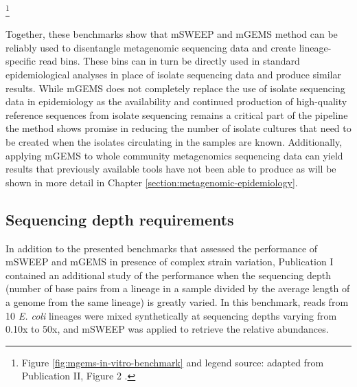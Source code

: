 \documentclass[officiallayout]{tktla}
\begin{document}
\noindent\let\thefootnote\relax\footnote{Figure \ref{fig:mgems-in-vitro-benchmark} and legend source: adapted from Publication II, Figure 2 \citep{maklin_bacterial_2021}.}

\pagebreak
Together, these benchmarks show that mSWEEP and mGEMS method can be
reliably used to disentangle metagenomic sequencing data and create
lineage-specific read bins. These bins can in turn be directly used in
standard epidemiological analyses in place of isolate sequencing data
and produce similar results. While mGEMS does not completely replace
the use of isolate sequencing data in epidemiology \textemdash{ } as
the availability and continued production of high-quality reference
sequences from isolate sequencing remains a critical part of the
pipeline \textemdash{ } the method shows promise in reducing the
number of isolate cultures that need to be created when the isolates
circulating in the samples are known. Additionally, applying mGEMS to
whole community metagenomics sequencing data can yield results that
previously available tools have not been able to produce as will be
shown in more detail in Chapter \ref{section:metagenomic-epidemiology}.

\subsection{Sequencing depth requirements}

In addition to the presented benchmarks that assessed the performance
of mSWEEP and mGEMS in presence of complex strain variation,
Publication I contained an additional study of the performance when
the sequencing depth (number of base pairs from a lineage in a sample
divided by the average length of a genome from the same lineage) is
greatly varied. In this benchmark, reads from 10 \textit{E. coli}
lineages were mixed synthetically at sequencing depths varying from
0.10x to 50x, and mSWEEP was applied to retrieve the relative
abundances.
\end{document}
